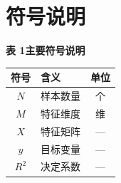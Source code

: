 \section{符号说明}

\begin{center}
  {\fontsize{10.5pt}{12.6pt}\heiti\bfseries 表 1\quad 主要符号说明}\\[0.6em]
  \begin{tabular}{clc}
    \toprule
    \textbf{符号} & \textbf{含义} & \textbf{单位} \\
    \midrule
    $N$   & 样本数量 & 个 \\
    $M$   & 特征维度 & 维 \\
    $X$   & 特征矩阵 & --- \\
    $y$   & 目标变量 & --- \\
    $R^2$ & 决定系数 & --- \\
    \bottomrule
  \end{tabular}
\end{center}
